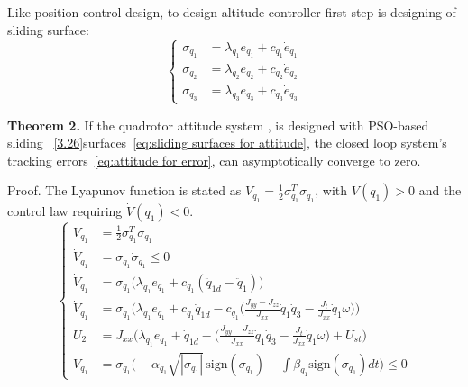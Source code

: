 \begin{small}
\begin{enumerate}
Like position control design, to design altitude controller first step is designing of sliding surface:
\begin{equation}
\left\{
\begin{aligned}
\sigma_{q_1} &= \lambda_{q_1} e_{q_1} + c_{q_1}\dot{e}_{q_1} \\[6pt]
\sigma_{q_2} &= \lambda_{q_2} e_{q_2} + c_{q_2}\dot{e}_{q_2} \\[6pt]
\sigma_{q_3} &= \lambda_{q_3} e_{q_3} + c_{q_3}\dot{e}_{q_3}
\end{aligned}
\right.
\label{eq:sliding surfaces for attitude}
\end{equation}


\noindent\textbf{Theorem 2.} If the quadrotor attitude system , is designed with 
PSO-based sliding ~\eqref{3.26}surfaces~\eqref{eq:sliding surfaces for attitude}, the closed loop system’s tracking errors~\eqref{eq:attitude for error}, 
can asymptotically converge to zero.  

\noindent Proof. The Lyapunov function is stated as 
$V_{q_1} = \tfrac{1}{2}\sigma_{q_1}^T \sigma_{q_1}$, with $V(q_1) > 0$ and the control law 
requiring $\dot{V}(q_1) < 0$.  
\begin{equation}
\left\{
\begin{align}
V_{q_1} &= \tfrac{1}{2}\sigma_{q_1}^T \sigma_{q_1} \\[6pt]
\dot{V}_{q_1} &= \sigma_{q_1}\dot{\sigma}_{q_1} \leq 0 \\[6pt]
\dot{V}_{q_1} &= \sigma_{q_1}\big(\lambda_{q_1} e_{q_1} + c_{q_1}(\ddot{q}_{1d}-\ddot{q}_1)\big) \\[6pt]
\dot{V}_{q_1} &= \sigma_{q_1}\Bigg(\lambda_{q_1} e_{q_1} + c_{q_1}\dot{q}_{1d} 
   - c_{q_1}\Big(\frac{J_{yy}-J_{zz}}{J_{xx}} \dot{q}_1 \dot{q}_3 
   - \frac{J_t}{J_{xx}} \dot{q}_1 \omega \Big)\Bigg) \\[6pt]
U_2 &= J_{xx}\Bigg(\lambda_{q_1} e_{q_1} + \dot{q}_{1d} 
   - \Big(\frac{J_{yy}-J_{zz}}{J_{xx}} \dot{q}_1 \dot{q}_3 
   - \frac{J_t}{J_{xx}} \dot{q}_1 \omega \Big) + U_{st}\Bigg) \\[6pt]
\dot{V}_{q_1} &= \sigma_{q_1}\Big(-\alpha_{q_1}\sqrt{|\sigma_{q_1}|}\,\text{sign}(\sigma_{q_1}) 
   - \int \beta_{q_1}\text{sign}(\sigma_{q_1})dt\Big) \leq 0
\end{align} 
\right.
\end{equation}





\end{enumerate}
\end{small}
